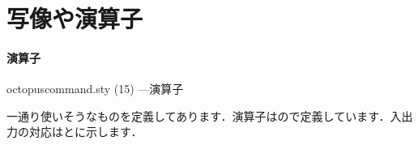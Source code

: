 \documentclass[uplatex]{jsreport}
\begin{document}
\section{写像や演算子}\label{section:mapop}
\paragraph{演算子}\hspace{0em}\par
\begin{insertcode}[firstnumber=194]{octopuscommand.sty (15) ---演算子}
%
%
%
%
%
\DeclareMathOperator{\conv}{conv}%
\DeclareMathOperator{\diag}{diag}%
\DeclareMathOperator{\Dec}{Dec}%
\DeclareMathOperator{\Enc}{Enc}%
\DeclareMathOperator{\GL}{GL}%
\DeclareMathOperator{\Hom}{Hom}%
\DeclareMathOperator{\Image}{Im}%
\DeclareMathOperator{\Kernel}{Ker}%
\DeclareMathOperator{\len}{len}%
\DeclareMathOperator{\Map}{Map}%
\DeclareMathOperator{\ord}{ord}%
\DeclareMathOperator{\ordO}{O}%
\DeclareMathOperator{\ordo}{o}%
\DeclareMathOperator{\ordOtilde}{\tilde{O}}%
\DeclareMathOperator{\ordTheta}{\Theta}%
\DeclareMathOperator{\ordtheta}{\theta}%
\DeclareMathOperator{\ordOmega}{\Omega}%
\DeclareMathOperator{\ordomega}{\omega}%
\DeclareMathOperator{\rank}{rank}
\DeclareMathOperator{\trace}{tr}
\DeclareMathOperator{\Trace}{Tr}
\end{insertcode}
一通り使いそうなものを定義してあります．演算子はので定義しています．入出力の対応はとに示します．
\par
\end{document}
